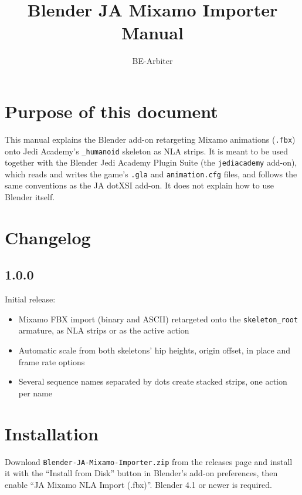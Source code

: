 \documentclass[a4paper,10pt]{article}
\title{Blender JA Mixamo Importer Manual}
\author{BE-Arbiter}
\begin{document}
 \maketitle

 \newpage

 \tableofcontents

 \newpage

 \section{Purpose of this document}

 This manual explains the Blender add-on retargeting Mixamo animations (\texttt{.fbx}) onto Jedi
 Academy's \texttt{\_humanoid} skeleton as NLA strips. It is meant to be used together with the
 Blender Jedi Academy Plugin Suite (the \texttt{jediacademy} add-on), which reads and writes the
 game's \texttt{.gla} and \texttt{animation.cfg} files, and follows the same conventions as the
 JA dotXSI add-on. It does not explain how to use Blender itself.

 \section{Changelog}

 \subsection*{1.0.0}
 Initial release:
 \begin{itemize}
  \item Mixamo FBX import (binary and ASCII) retargeted onto the \texttt{skeleton\_root} armature,
        as NLA strips or as the active action
  \item Automatic scale from both skeletons' hip heights, origin offset, in place and frame rate options
  \item Several sequence names separated by dots create stacked strips, one action per name
 \end{itemize}

 \section{Installation}

 Download \texttt{Blender-JA-Mixamo-Importer.zip} from the releases page and install it with the
 ``Install from Disk'' button in Blender's add-on preferences, then enable
 ``JA Mixamo NLA Import (.fbx)''. Blender 4.1 or newer is required.
\end{document}
